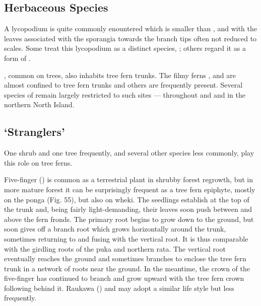 \subsection{Herbaceous Species}

A lycopodium is quite commonly enountered which is smaller than , and with the leaves associated with the sporangia towards the branch tips often not reduced to scales.
Some treat this lycopodium as a distinct species, ; others regard it as a form of .

, common on trees, also inhabits tree fern trunks.
The filmy ferns ,  and  are almost confined to tree fern trunks and others are frequently present.
Several species of  remain largely restricted to such sites —  throughout and  and  in the northern North Island.

\subsection{`Stranglers'}

One shrub and one tree frequently, and several other species less commonly, play this role on tree ferns.

Five-finger () is common as a terrestrial plant in shrubby forest regrowth, but in more mature forest it can be surprisingly frequent as a tree fern epiphyte, mostly on the ponga (Fig. 55), but also on wheki.
The seedlings establish at the top of the trunk and, being fairly light-demanding, their leaves soon push between and above the fern fronds.
The primary root begins to grow down to the ground, but soon gives off a branch root which grows horizontally around the trunk, sometimes returning to and fusing with the vertical root.
It is thus comparable with the girdling roots of the puka and northern rata.
The vertical root eventually reaches the ground and sometimes branches to enclose the tree fern trunk in a network of roots near the ground.
In the meantime, the crown of the five-finger has continued to branch and grow upward with the tree fern crown following behind it.
Raukawa () and  may adopt a similar life style but less frequently.

